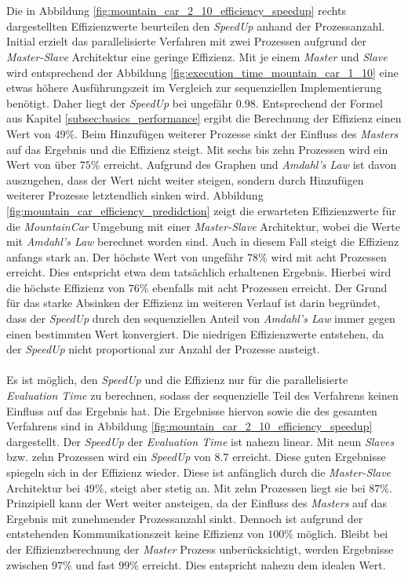 \\\\
Die in Abbildung \ref{fig:mountain_car_2_10_efficiency_speedup} rechts dargestellten Effizienzwerte beurteilen den \emph{SpeedUp} anhand der Prozessanzahl. Initial erzielt das parallelisierte Verfahren mit zwei Prozessen aufgrund der \emph{Master-Slave} Architektur eine geringe Effizienz. Mit je einem \emph{Master} und \emph{Slave} wird entsprechend der Abbildung \ref{fig:execution_time_mountain_car_1_10} eine etwas höhere Ausführungszeit im Vergleich zur sequenziellen Implementierung benötigt. Daher liegt der \emph{SpeedUp} bei ungefähr $0.98$. Entsprechend der Formel aus Kapitel \ref{subsec:basics_performance} ergibt die Berechnung der Effizienz einen Wert von $49\%$. Beim Hinzufügen weiterer Prozesse sinkt der Einfluss des \emph{Masters} auf das Ergebnis und die Effizienz steigt. Mit sechs bis zehn Prozessen wird ein Wert von über $75\%$ erreicht. Aufgrund des Graphen und \emph{Amdahl's Law} ist davon auszugehen, dass der Wert nicht weiter steigen, sondern durch Hinzufügen weiterer Prozesse letztendlich sinken wird. Abbildung \ref{fig:mountain_car_efficiency_predidction} zeigt die erwarteten Effizienzwerte für die \emph{MountainCar} Umgebung mit einer \emph{Master-Slave} Architektur, wobei die Werte mit \emph{Amdahl's Law} berechnet worden sind. Auch in diesem Fall steigt die Effizienz anfangs stark an. Der höchste Wert von ungefähr $78\%$ wird mit acht Prozessen erreicht. Dies entspricht etwa dem tatsächlich erhaltenen Ergebnis. Hierbei wird die höchste Effizienz von $76\%$ ebenfalls mit acht Prozessen erreicht. Der Grund für das starke Absinken der Effizienz im weiteren Verlauf ist darin begründet, dass der \emph{SpeedUp} durch den sequenziellen Anteil von \emph{Amdahl's Law} immer gegen einen bestimmten Wert konvergiert. Die niedrigen Effizienzwerte entstehen, da der \emph{SpeedUp} nicht proportional zur Anzahl der Prozesse ansteigt.
\\\\
Es ist möglich, den \emph{SpeedUp} und die Effizienz nur für die parallelisierte \emph{Evaluation Time} zu berechnen, sodass der sequenzielle Teil des Verfahrens keinen Einfluss auf das Ergebnis hat. Die Ergebnisse hiervon sowie die des gesamten Verfahrens sind in Abbildung \ref{fig:mountain_car_2_10_efficiency_speedup} dargestellt. Der \emph{SpeedUp} der \emph{Evaluation Time} ist nahezu linear. Mit neun \emph{Slaves} bzw. zehn Prozessen wird ein \emph{SpeedUp} von $8.7$ erreicht. Diese guten Ergebnisse spiegeln sich in der Effizienz wieder. Diese ist anfänglich durch die \emph{Master-Slave} Architektur bei $49\%$, steigt aber stetig an. Mit zehn Prozessen liegt sie bei $87\%$. Prinzipiell kann der Wert weiter ansteigen, da der Einfluss des \emph{Masters} auf das Ergebnis mit zunehmender Prozessanzahl sinkt. Dennoch ist aufgrund der entstehenden Kommunikationszeit keine Effizienz von $100\%$ möglich. Bleibt bei der Effizienzberechnung der \emph{Master} Prozess unberücksichtigt, werden Ergebnisse zwischen $97\%$ und fast $99\%$ erreicht. Dies entspricht nahezu dem idealen Wert.

